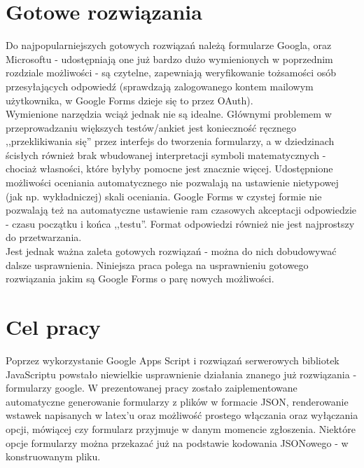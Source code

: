 \section{Gotowe rozwiązania}
Do najpopularniejszych gotowych rozwiązań należą formularze Googla, oraz Microsoftu - udostępniają one już bardzo dużo wymienionych w poprzednim rozdziale możliwości - są czytelne, zapewniają weryfikowanie  tożsamości osób przesyłających odpowiedź (sprawdzają zalogowanego kontem mailowym użytkownika, w Google Forms dzieje się  to przez OAuth).
\\ Wymienione narzędzia wciąż jednak nie są idealne. Głównymi problemem w przeprowadzaniu większych testów/ankiet jest konieczność ręcznego ,,przeklikiwania się'' przez interfejs do tworzenia formularzy, a w dziedzinach ścisłych również brak wbudowanej interpretacji symboli matematycznych - chociaż własności, które byłyby pomocne jest znacznie więcej. Udostępnione możliwości oceniania automatycznego nie pozwalają na ustawienie nietypowej (jak np. wykładniczej) skali oceniania. Google Forms w czystej formie nie pozwalają też na automatyczne ustawienie ram czasowych akceptacji odpowiedzie - czasu początku i końca ,,testu''. Format odpowiedzi również nie jest najprostszy do przetwarzania.
\\Jest jednak ważna zaleta gotowych rozwiązań - można do nich dobudowywać dalsze usprawnienia. Niniejsza praca polega na usprawnieniu gotowego rozwiązania jakim są Google Forms o parę nowych możliwości.
\section{Cel pracy}
 Poprzez wykorzystanie Google Apps Script  i rozwiązań serwerowych bibliotek JavaScriptu powstało niewielkie usprawnienie działania znanego już rozwiązania - formularzy google. W prezentowanej pracy zostało zaiplementowane automatyczne generowanie formularzy z plików w formacie JSON, renderowanie wstawek napisanych w latex'u oraz możliwość prostego włączania oraz wyłączania opcji, mówiącej czy formularz przyjmuje w danym momencie zgłoszenia. Niektóre opcje formularzy można  przekazać już na podstawie kodowania JSONowego - w konstruowanym pliku.

